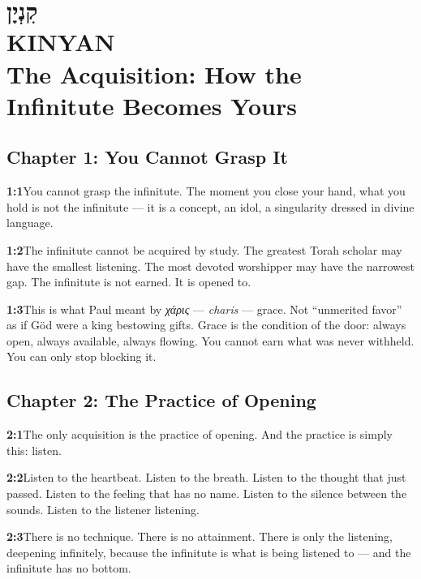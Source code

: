 \documentclass[11pt,openany]{book}
\newcommand{\heb}[1]{{\hebrewfont #1}}
\newcommand{\grk}[1]{{\itshape #1}}  %
\begin{document}
\chapter[Kinyan]{%
  \Large\heb{קִנְיָן}\\[8pt]
  \huge KINYAN\\[4pt]
  \large The Acquisition: How the Infinitute Becomes Yours}

\section*{Chapter 1: You Cannot Grasp It}

\noindent\textbf{1:1}\quad You cannot grasp the infinitute. The moment you close your hand, what you hold is not the infinitute — it is a concept, an idol, a singularity dressed in divine language.

\noindent\textbf{1:2}\quad The infinitute cannot be acquired by study. The greatest Torah scholar may have the smallest listening. The most devoted worshipper may have the narrowest gap. The infinitute is not earned. It is opened to.

\noindent\textbf{1:3}\quad This is what Paul meant by \grk{χάρις} — \textit{charis} — grace. Not ``unmerited favor'' as if Göd were a king bestowing gifts. Grace is the condition of the door: always open, always available, always flowing. You cannot earn what was never withheld. You can only stop blocking it.

\section*{Chapter 2: The Practice of Opening}

\noindent\textbf{2:1}\quad The only acquisition is the practice of opening. And the practice is simply this: listen.

\noindent\textbf{2:2}\quad Listen to the heartbeat. Listen to the breath. Listen to the thought that just passed. Listen to the feeling that has no name. Listen to the silence between the sounds. Listen to the listener listening.

\noindent\textbf{2:3}\quad There is no technique. There is no attainment. There is only the listening, deepening infinitely, because the infinitute is what is being listened to — and the infinitute has no bottom.
\end{document}
